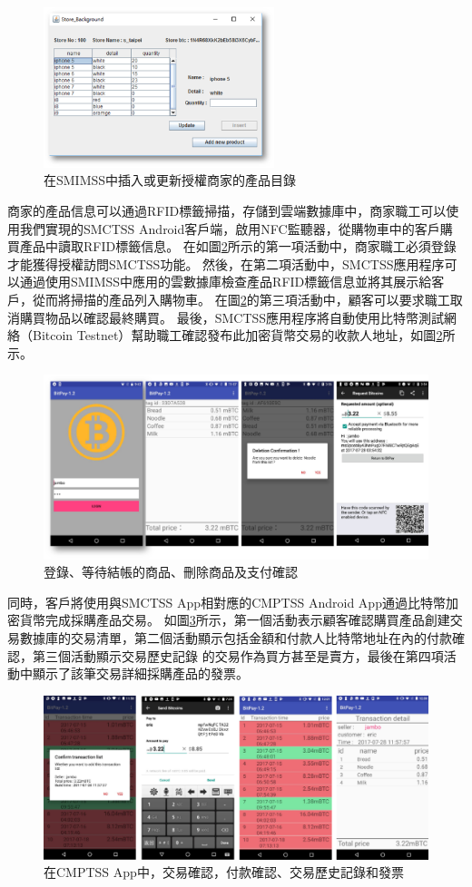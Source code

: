 \begin{figure}[!htbp]
	\centering
	\includegraphics[width = 0.6\textwidth]{fig6.png}
	\caption{在SMIMSS中插入或更新授權商家的產品目錄}\label{fig6}
\end{figure}

商家的產品信息可以通過RFID標籤掃描，存儲到雲端數據庫中，商家職工可以使用我們實現的SMCTSS Android客戶端，啟用NFC監聽器，從購物車中的客戶購買產品中讀取RFID標籤信息。 在如圖\ref{fig7}所示的第一項活動中，商家職工必須登錄才能獲得授權訪問SMCTSS功能。 然後，在第二項活動中，SMCTSS應用程序可以通過使用SMIMSS中應用的雲數據庫檢查產品RFID標籤信息並將其展示給客戶，從而將掃描的產品列入購物車。 在圖\ref{fig7}的第三項活動中，顧客可以要求職工取消購買物品以確認最終購買。 最後，SMCTSS應用程序將自動使用比特幣測試網絡（Bitcoin Testnet）\supercite{bitcointestnet}幫助職工確認發布此加密貨幣交易的收款人地址，如圖\ref{fig7}所示。    

\begin{figure}[!htbp]
	\centering
	\includegraphics[width = 1\textwidth]{fig7.png}
	\caption{登錄、等待結帳的商品、刪除商品及支付確認}\label{fig7}
\end{figure}

同時，客戶將使用與SMCTSS App相對應的CMPTSS Android App通過比特幣加密貨幣完成採購產品交易。 如圖\ref{fig8}所示，第一個活動表示顧客確認購買產品創建交易數據庫的交易清單，第二個活動顯示包括金額和付款人比特幣地址在內的付款確認，第三個活動顯示交易歷史記錄 的交易作為買方甚至是賣方，最後在第四項活動中顯示了該筆交易詳細採購產品的發票。    

\begin{figure}[!htbp]
	\centering
	\includegraphics[width = 1\textwidth]{fig8.png}
	\caption{在CMPTSS App中，交易確認，付款確認、交易歷史記錄和發票}\label{fig8}
\end{figure}